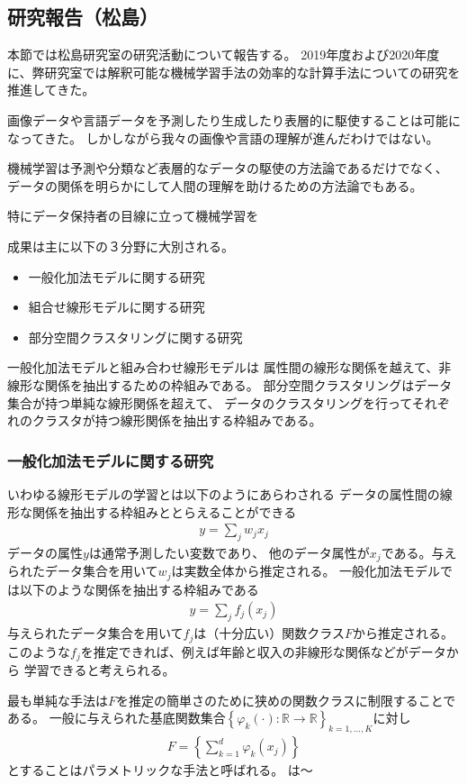 \subsection{研究報告（松島）}
本節では松島研究室の研究活動について報告する。
2019年度および2020年度に、弊研究室では解釈可能な機械学習手法の効率的な計算手法についての研究を推進してきた。

画像データや言語データを予測したり生成したり表層的に駆使することは可能になってきた。
しかしながら我々の画像や言語の理解が進んだわけではない。

機械学習は予測や分類など表層的なデータの駆使の方法論であるだけでなく、
データの関係を明らかにして人間の理解を助けるための方法論でもある。

特にデータ保持者の目線に立って機械学習を


成果は主に以下の３分野に大別される。
\begin{itemize}
    \item 一般化加法モデルに関する研究
    \item 組合せ線形モデルに関する研究
    \item 部分空間クラスタリングに関する研究
\end{itemize}

一般化加法モデルと組み合わせ線形モデルは
属性間の線形な関係を越えて、非線形な関係を抽出するための枠組みである。
部分空間クラスタリングはデータ集合が持つ単純な線形関係を超えて、
データのクラスタリングを行ってそれぞれのクラスタが持つ線形関係を抽出する枠組みである。


\subsubsection{一般化加法モデルに関する研究}
いわゆる線形モデルの学習とは以下のようにあらわされる
データの属性間の線形な関係を抽出する枠組みととらえることができる
\begin{align*}
    y = \sum_{j} w_j x_j
\end{align*}
データの属性$y$は通常予測したい変数であり、
他のデータ属性が$x_j$である。与えられたデータ集合を用いて$w_j$は実数全体から推定される。
一般化加法モデルでは以下のような関係を抽出する枠組みである
\begin{align*}
    y = \sum_{j} f_j (x_j)
\end{align*}
与えられたデータ集合を用いて$f_j$は（十分広い）関数クラス$F$から推定される。
このような$f_j$を推定できれば、例えば年齢と収入の非線形な関係などがデータから
学習できると考えられる。

最も単純な手法は$F$を推定の簡単さのために狭めの関数クラスに制限することである。
一般に与えられた基底関数集合$\left\{\varphi_k(\cdot):\mathbb{R} \to \mathbb{R} \right\}_{k=1,\ldots,K}$に対し
\begin{align*}
  F=\left\{  \sum_{k=1}^d \varphi_k(x_j) \right\}
\end{align*}
とすることはパラメトリックな手法と呼ばれる。
\cite{F}は〜\\

